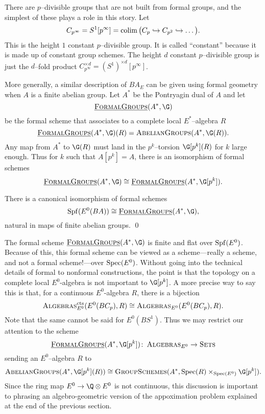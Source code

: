There are $p$--divisible groups that are not built from formal groups, and the simplest of these plays a role in this story. Let 
\[
C_{p^{\infty}} = S^1[p^\infty] = \operatorname*{colim} \big ( C_p \hookrightarrow C_{p^2} \hookrightarrow \ldots \big ).
\]
This is the height $1$ constant $p$--divisible group. It is called ``constant'' because it is made up of constant group schemes. The height $d$ constant $p$--divisible group is just the $d$--fold product $C_{p^\infty}^{\times d} = (S^1)^{\times d}[p^\infty]$.

More generally, a similar description of $BA_{E}$ can be given using formal geometry when $A$ is a finite abelian group. Let $A^*$ be the Pontryagin dual of $A$ and let
\[
\InternalHom{FormalGroups}(A^*, \G)
\]
be the formal scheme that associates to a complete local $E^*$--algebra $R$
\[
\InternalHom{FormalGroups}(A^*, \G)(R) = \CatOf{AbelianGroups}(A^*, \G(R)).
\]
Any map from $A^*$ to $\G(R)$ must land in the $p^k$--torsion $\G[p^k](R)$ for $k$ large enough. Thus for $k$ such that $A[p^k] = A$, there is an isomorphism of formal schemes
\[
\InternalHom{FormalGroups}(A^*, \G) \cong \InternalHom{FormalGroups}(A^*, \G[p^k]).
\]
\begin{proposition} \label{app:abeliangroupdualhom}
There is a canonical isomorphism of formal schemes
\[
\Spf(E^0(BA)) \cong \InternalHom{FormalGroups}(A^*, \G),
\]
natural in maps of finite abelian groups. \qed
\end{proposition}


The formal scheme $\InternalHom{FormalGroups}(A^*,\G)$ is finite and flat over $\operatorname{Spf}(E^0)$. Because of this, this formal scheme can be viewed as a scheme---really a scheme, and not a formal scheme!---over $\operatorname{Spec}(E^0)$. Without going into the technical details of formal to nonformal constructions, the point is that the topology on a complete local $E^0$-algebra is not important to $\G[p^k]$. A more precise way to say this is that, for a continuous $E^0$-algebra $R$, there is a bijection
\[
\normalfont\textsc{Algebras}_{E^0}^{\mathrm{cts}}(E^0(BC_p),R) \cong \normalfont\textsc{Algebras}_{E^0}(E^0(BC_p),R).
\]
Note that the same cannot be said for $E^0(BS^1)$. Thus we may restrict our attention to the scheme
\[
\InternalHom{FormalGroups}(A^*,\G[p^k]) \co \CatOf{Algebras}_{E^0} \rightarrow \CatOf{Sets}
\]
sending an $E^0$--algebra $R$ to
\[
\CatOf{AbelianGroups}(A^*, \G[p^k](R)) \cong \CatOf{GroupSchemes}(A^*, \Spec(R) \times_{\Spec(E^0)} \G[p^k]).
\]
Since the ring map $E^0 \rightarrow \Q \otimes E^0$ is not continuous, this discussion is important to phrasing an algebro-geometric version of the appoximation problem explained at the end of the previous section.

